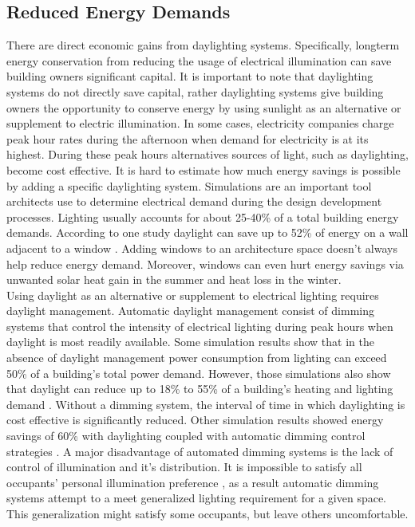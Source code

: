 \subsection{Reduced Energy Demands}
There are direct economic gains from daylighting systems.  Specifically, longterm energy conservation from reducing the usage of electrical illumination can save building owners significant capital.  It is important to note that daylighting systems do not directly save capital, rather daylighting systems give building owners the opportunity to conserve energy by using sunlight as an alternative or supplement to electric illumination. In some cases, electricity companies charge peak hour rates during the afternoon when demand for electricity is at its highest. During these peak hours alternatives sources of light, such as daylighting, become cost effective.  It is hard to estimate how much energy savings is possible by adding a specific daylighting system. Simulations are an important tool architects use to determine electrical demand during the design development processes.  Lighting usually accounts for about 25-40\% of a total building energy demands.  According to one study daylight can save up to 52\% of energy on a wall adjacent to a window \cite{Leslie}.  Adding windows to an architecture space doesn't always help reduce energy demand. Moreover, windows can even hurt energy savings via unwanted solar heat gain in the summer and heat loss in the winter. \\

Using daylight as an alternative or supplement to electrical lighting requires daylight management. Automatic daylight management consist of dimming systems that control the intensity of electrical lighting during peak hours when daylight is most readily available.  Some simulation results show that in the absence of daylight management power consumption from lighting can exceed 50\% of a building's total power demand.  However, those simulations also show that daylight can reduce up to 18\% to 55\% of a building's heating and lighting demand \cite{Bodart}.  Without a dimming system, the interval of time in which daylighting is cost effective is significantly reduced. Other simulation results showed energy savings of 60\% with daylighting coupled with automatic dimming control strategies \cite{Ihm}.  A major disadvantage of automated dimming systems is the lack of control of illumination and it's distribution. It is impossible to satisfy all occupants' personal illumination preference \cite{galasiu2006occupant}, as a result automatic dimming systems attempt to a meet generalized lighting requirement for a given space. This generalization might satisfy some occupants, but leave others uncomfortable.\\ 

